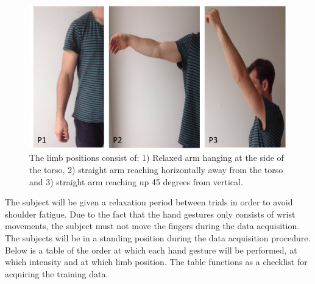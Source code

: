 \begin{figure}[H]                    
	\includegraphics[width=1\textwidth]{figures/protocol/limb_positions}  %
	\caption{The limb positions consist of: 1) Relaxed arm hanging at the side of the torso, 2) straight arm reaching horizontally away from the torso and 3) straight arm reaching up 45 degrees from vertical.}
	\label{fig:limb_positions}  %
\end{figure}

The subject will be given a relaxation period between trials in order to avoid shoulder fatigue.
Due to the fact that the hand gestures only consists of wrist movements, the subject must not move the fingers during the data acquisition.
The subjects will be in a standing position during the data acquisition procedure.
Below is a table of the order at which each hand gesture will be performed, at which intensity and at which limb position. The table functions as a checklist for acquiring the training data.

